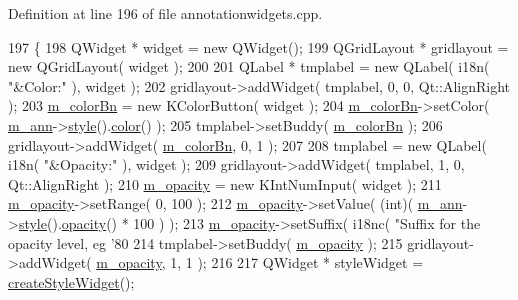 Definition at line 196 of file annotationwidgets.\+cpp.


\begin{DoxyCode}
197 \{
198     QWidget * widget = \textcolor{keyword}{new} QWidget();
199     QGridLayout * gridlayout = \textcolor{keyword}{new} QGridLayout( widget );
200 
201     QLabel * tmplabel = \textcolor{keyword}{new} QLabel( i18n( \textcolor{stringliteral}{"&Color:"} ), widget );
202     gridlayout->addWidget( tmplabel, 0, 0, Qt::AlignRight );
203     \hyperlink{classAnnotationWidget_a39083eda5b61826f4b48a787361b9dfc}{m\_colorBn} = \textcolor{keyword}{new} KColorButton( widget );
204     \hyperlink{classAnnotationWidget_a39083eda5b61826f4b48a787361b9dfc}{m\_colorBn}->setColor( \hyperlink{classAnnotationWidget_a6b7e6688554d24cfea509b139b3ecedc}{m\_ann}->\hyperlink{classOkular_1_1Annotation_ae1f845ddbd6d524b2b388c6c9ef26423}{style}().\hyperlink{classOkular_1_1Annotation_1_1Style_a2c32cb2b41ef8732ddcd3d3dffc20b7d}{color}() );
205     tmplabel->setBuddy( \hyperlink{classAnnotationWidget_a39083eda5b61826f4b48a787361b9dfc}{m\_colorBn} );
206     gridlayout->addWidget( \hyperlink{classAnnotationWidget_a39083eda5b61826f4b48a787361b9dfc}{m\_colorBn}, 0, 1 );
207 
208     tmplabel = \textcolor{keyword}{new} QLabel( i18n( \textcolor{stringliteral}{"&Opacity:"} ), widget );
209     gridlayout->addWidget( tmplabel, 1, 0, Qt::AlignRight );
210     \hyperlink{classAnnotationWidget_a234fb5913752d6e4462084b217f3ff6c}{m\_opacity} = \textcolor{keyword}{new} KIntNumInput( widget );
211     \hyperlink{classAnnotationWidget_a234fb5913752d6e4462084b217f3ff6c}{m\_opacity}->setRange( 0, 100 );
212     \hyperlink{classAnnotationWidget_a234fb5913752d6e4462084b217f3ff6c}{m\_opacity}->setValue( (\textcolor{keywordtype}{int})( \hyperlink{classAnnotationWidget_a6b7e6688554d24cfea509b139b3ecedc}{m\_ann}->\hyperlink{classOkular_1_1Annotation_ae1f845ddbd6d524b2b388c6c9ef26423}{style}().\hyperlink{classOkular_1_1Annotation_1_1Style_abb17b057d91f128793b3fa3d4b556a45}{opacity}() * 100 ) );
213     \hyperlink{classAnnotationWidget_a234fb5913752d6e4462084b217f3ff6c}{m\_opacity}->setSuffix( i18nc( \textcolor{stringliteral}{"Suffix for the opacity level, eg '80 %
214     tmplabel->setBuddy( \hyperlink{classAnnotationWidget_a234fb5913752d6e4462084b217f3ff6c}{m\_opacity} );
215     gridlayout->addWidget( \hyperlink{classAnnotationWidget_a234fb5913752d6e4462084b217f3ff6c}{m\_opacity}, 1, 1 );
216 
217     QWidget * styleWidget = \hyperlink{classAnnotationWidget_a4b0926d20f0b26deb5b6a4e75f78fac3}{createStyleWidget}();
}
\end{DoxyCode}
